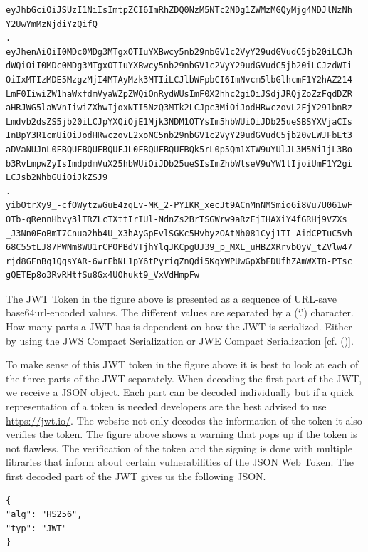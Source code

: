 {\begin{lstlisting}
eyJhbGciOiJSUzI1NiIsImtpZCI6ImRhZDQ0NzM5NTc2NDg1ZWMzMGQyMjg4NDJlNzNh
Y2UwYmMzNjdiYzQifQ
.
eyJhenAiOiI0MDc0MDg3MTgxOTIuYXBwcy5nb29nbGV1c2VyY29udGVudC5jb20iLCJh
dWQiOiI0MDc0MDg3MTgxOTIuYXBwcy5nb29nbGV1c2VyY29udGVudC5jb20iLCJzdWIi
OiIxMTIzMDE5MzgzMjI4MTAyMzk3MTIiLCJlbWFpbCI6ImNvcm5lbGlhcmF1Y2hAZ214
LmF0IiwiZW1haWxfdmVyaWZpZWQiOnRydWUsImF0X2hhc2giOiJSdjJRQjZoZzFqdDZR
aHRJWG5laWVnIiwiZXhwIjoxNTI5NzQ3MTk2LCJpc3MiOiJodHRwczovL2FjY291bnRz
Lmdvb2dsZS5jb20iLCJpYXQiOjE1Mjk3NDM1OTYsIm5hbWUiOiJDb25ueSBSYXVjaCIs
InBpY3R1cmUiOiJodHRwczovL2xoNC5nb29nbGV1c2VyY29udGVudC5jb20vLWJFbEt3
aDVaNUJnL0FBQUFBQUFBQUFJL0FBQUFBQUFBQk5rL0p5Qm1XTW9uYUlJL3M5Ni1jL3Bo
b3RvLmpwZyIsImdpdmVuX25hbWUiOiJDb25ueSIsImZhbWlseV9uYW1lIjoiUmF1Y2gi
LCJsb2NhbGUiOiJkZSJ9
.
yibOtrXy9_-cfOWytzwGuE4zqLv-MK_2-PYIKR_xecJt9ACnMnNMSmio6i8Vu7U061wF
OTb-qRennHbvy3lTRZLcTXttIrIUl-NdnZs2BrTSGWrw9aRzEjIHAXiY4fGRHj9VZXs_
_J3Nn0EoBmT7Cnua2hb4U_X3hAyGpEvlSGKc5HvbyzOAtNh081Cyj1TI-AidCPTuC5vh
68C55tLJ87PWNm8WU1rCPOPBdVTjhYlqJKCpgUJ39_p_MXL_uHBZXRrvbOyV_tZVlw47
rjd8GFnBq1QqsYAR-6wrFbNL1pY6tPyriqZnQdi5KqYWPUwGpXbFDUfhZAmWXT8-PTsc
gQETEp8o3RvRHtfSu8Gx4UOhukt9_VxVdHmpFw
\end{lstlisting}


The JWT Token in the figure above is presented as a sequence of URL-save base64url-encoded values. The different values are separated by a (‘.’) character. How many parts a JWT has is dependent on how the JWT is serialized. Either by using the JWS Compact Serialization or JWE Compact Serialization  [cf. (\cite{JWT:IETF:Jones:2015})].


To make sense of this JWT token in the figure above it is best to look at each of the three parts of the JWT separately. When decoding the first part of the JWT, we receive a JSON object. Each part can be decoded individually but if a quick representation of a token is needed developers are the best advised to use \href{https://jwt.io/} {https://jwt.io/}. The website not only decodes the information of the token it also verifies the token. The figure above shows a warning that pops up if the token is not flawless. The verification of the token and the signing is done with multiple libraries that inform about certain vulnerabilities of the JSON Web Token. The first decoded part of the JWT gives us the following JSON.


\begin{lstlisting}
{
"alg": "HS256",
"typ": "JWT"
}
\end{lstlisting}


}
